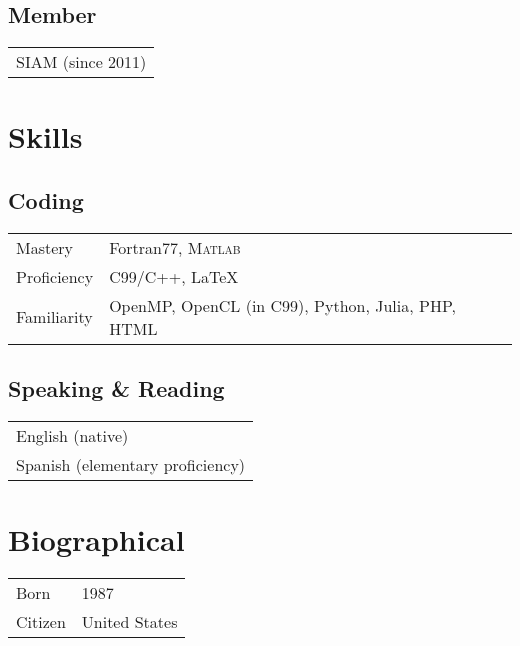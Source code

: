 \subsection{Member}
\begin{tabular}{p{17cm}}
SIAM (since 2011)
\end{tabular}


\section{Skills}
\subsection{Coding}
\begin{tabular}{p{2cm}p{15cm}}
Mastery & Fortran77, \textsc{Matlab} \\
Proficiency & C99/C++, \LaTeX \\
Familiarity & OpenMP, OpenCL (in C99), Python, Julia, PHP, HTML
\end{tabular}

\subsection{Speaking \& Reading}
\begin{tabular}{p{17cm}}
English (native) \\
Spanish (elementary proficiency)
\end{tabular}

\section{Biographical}
\begin{tabular}{p{2cm}p{13cm}}
Born & 1987 \\
Citizen & United States
\end{tabular}

